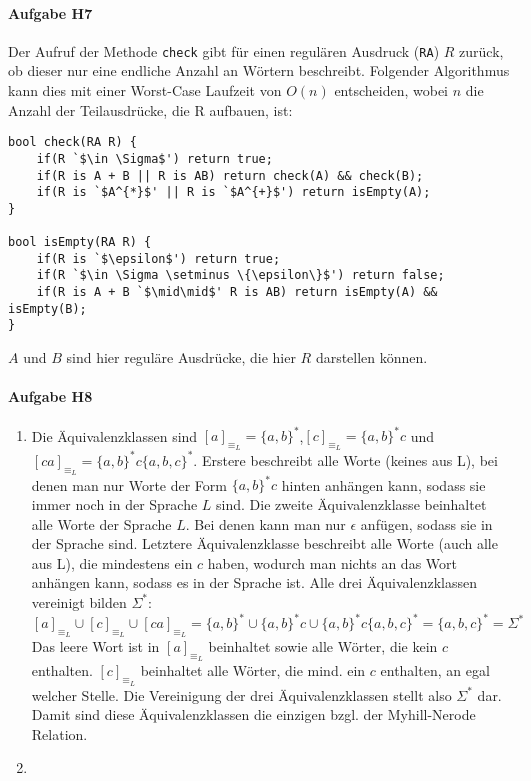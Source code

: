 \documentclass[11pt]{article}
\begin{document}

\paragraph{Aufgabe H7}
Der Aufruf der Methode \verb|check| gibt für einen regulären Ausdruck (\verb|RA|) $R$ zurück, ob dieser nur eine endliche Anzahl an Wörtern beschreibt. Folgender Algorithmus kann dies mit einer Worst-Case Laufzeit von $O(n)$ entscheiden, wobei $n$ die Anzahl der Teilausdrücke, die R aufbauen, ist:
\begin{lstlisting}[escapeinside=`']
bool check(RA R) {
	if(R `$\in \Sigma$') return true;
	if(R is A + B || R is AB) return check(A) && check(B);
	if(R is `$A^{*}$' || R is `$A^{+}$') return isEmpty(A);
}

bool isEmpty(RA R) {
	if(R is `$\epsilon$') return true;
	if(R `$\in \Sigma \setminus \{\epsilon\}$') return false;
	if(R is A + B `$\mid\mid$' R is AB) return isEmpty(A) && isEmpty(B);
}
\end{lstlisting}
$A$ und $B$ sind hier reguläre Ausdrücke, die hier $R$ darstellen können.

\paragraph{Aufgabe H8}
\begin{enumerate}[label=\alph*)]
\item 	Die Äquivalenzklassen sind $[a]_{\equiv _{L}} = \{a,b\}^{*}$,$[c]_{\equiv _{L}} = \{a,b\}^{*}c$ und $[ca]_{\equiv _{L}} = \{a,b\}^{*}c\{a,b,c\}^{*}$. Erstere beschreibt alle Worte (keines aus L), bei denen man nur Worte der Form $\{a,b\}^{*}c$ hinten anhängen kann, sodass sie immer noch in der Sprache $L$ sind. Die zweite Äquivalenzklasse beinhaltet alle Worte der Sprache $L$. Bei denen kann man nur $\epsilon$ anfügen, sodass sie in der Sprache sind. Letztere Äquivalenzklasse beschreibt alle Worte (auch alle aus L), die mindestens ein $c$ haben, wodurch man nichts an das Wort anhängen kann, sodass es in der Sprache ist. Alle drei Äquivalenzklassen vereinigt bilden $\Sigma^{*}$:
\[[a]_{\equiv _{L}} \cup [c]_{\equiv _{L}} \cup [ca]_{\equiv _{L}} = \{a,b\}^{*} \cup \{a,b\}^{*}c \cup \{a,b\}^{*}c\{a,b,c\}^{*} = \{a,b,c\}^{*} = \Sigma^{*}\]
Das leere Wort ist in $[a]_{\equiv _{L}}$ beinhaltet sowie alle Wörter, die kein $c$ enthalten. $[c]_{\equiv _{L}}$ beinhaltet alle Wörter, die mind. ein $c$ enthalten, an egal welcher Stelle. Die Vereinigung der drei Äquivalenzklassen stellt also $\Sigma^{*}$ dar. 
\\Damit sind diese Äquivalenzklassen die einzigen bzgl. der Myhill-Nerode Relation.

\item	
\end{enumerate}
\end{document}
